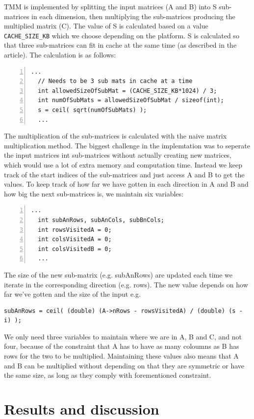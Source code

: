 TMM is implemented by splitting the input matrices (A and B) into S sub-matrices in each dimension, then multiplying the sub-matrices producing the multiplied matrix (C). 
The value of S is calculated based on a value \verb!CACHE_SIZE_KB! which we choose depending on the platform. S is calculated so that three sub-matrices can fit in cache at the same time (as described in the article).
The calculation is as follows:
\begin{lstlisting}[numbers=left]
  ...
  // Needs to be 3 sub mats in cache at a time
  int allowedSizeOfSubMat = (CACHE_SIZE_KB*1024) / 3;
  int numOfSubMats = allowedSizeOfSubMat / sizeof(int);
  s = ceil( sqrt(numOfSubMats) );
  ... 
\end{lstlisting}
The multiplication of the sub-matrices is calculated with the naive matrix multiplication method. 
The biggest challenge in the implemtation was to seperate the input matrices int sub-matrices without actually creating new matrices, which would use a lot of extra memory and computation time. 
Instead we keep track of the start indices of the sub-matrices and just access A and B to get the values. 
To keep track of how far we have gotten in each direction in A and B and how big the next sub-matrices is, we maintain six variables:
\begin{lstlisting}[numbers=left]
  ...
  int subAnRows, subAnCols, subBnCols;
  int rowsVisitedA = 0;
  int colsVisitedA = 0;
  int colsVisitedB = 0;
  ...
\end{lstlisting}
The size of the new sub-matrix (e.g. subAnRows) are updated each time we iterate in the corresponding direction (e.g. rows). 
The new value depends on how far we've gotten and the size of the input e.g.
\begin{lstlisting}
subAnRows = ceil( (double) (A->nRows - rowsVisitedA) / (double) (s - i) );
\end{lstlisting}

We only need three variables to maintain where we are in A, B and C, and not four, because of the constraint that A has to have as many coloumns as B has rows for the two to be multiplied. 
Maintaining these values also means that A and B can be multiplied without depending on that they are symmetric or have the same size, as long as they comply with forementioned constraint.



\section{Results and discussion}



